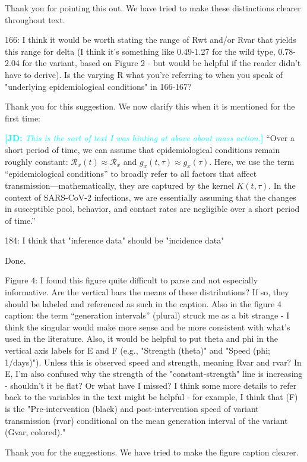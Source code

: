 \documentclass[12pt]{article}
\newcommand{\RR}{\ensuremath{{\mathcal R}}\xspace}
\newcommand{\revtext}{\textsf}
\newcommand{\comment}[3]{\textcolor{#1}{\textbf{[#2: }\textsl{#3}\textbf{]}}}
\newcommand{\jd}[1]{\comment{cyan}{JD}{#1}}
\begin{document}
Thank you for pointing this out. We have tried to make these distinctions clearer throughout text. 

\revtext{166: I think it would be worth stating the range of Rwt and/or Rvar that yields this range for delta (I think it's something like 0.49-1.27 for the wild type, 0.78-2.04 for the variant, based on Figure 2 - but would be helpful if the reader didn't have to derive). Is the varying R what you're referring to when you speak of "underlying epidemiological conditions" in 166-167?}

Thank you for this suggestion. We now clarify this when it is mentioned for the first time:

\jd{This is the sort of text I was hinting at above about mass action.}
``Over a short period of time, we can assume that epidemiological conditions remain roughly constant: $\RR_x(t) \approx \RR_x$ and $g_x(t, \tau) \approx g_x(\tau)$.
Here, we use the term ``epidemiological conditions'' to broadly refer to all factors that affect transmission---mathematically, they are captured by the kernel $K(t, \tau)$.
In the context of SARS-CoV-2 infections, we are essentially assuming that the changes in susceptible pool, behavior, and contact rates are negligible over a short period of time.''

\revtext{184: I think that "inference data" should be "incidence data"}

Done.

\revtext{Figure 4: I found this figure quite difficult to parse and not especially informative. Are the vertical bars the means of these distributions? If so, they should be labeled and referenced as such in the caption. Also in the figure 4 caption: the term ``generation intervals'' (plural) struck me as a bit strange - I think the singular would make more sense and be more consistent with what's used in the literature. Also, it would be helpful to put theta and phi in the vertical axis labels for E and F (e.g., "Strength (theta)" and "Speed (phi; 1/days)"). Unless this is observed speed and strength, meaning Rvar and rvar? In E, I'm also confused why the strength of the "constant-strength" line is increasing - shouldn't it be flat? Or what have I missed? I think some more details to refer back to the variables in the text might be helpful - for example, I think that (F) is the "Pre-intervention (black) and post-intervention speed of variant transmission (rvar) conditional on the mean generation interval of the variant (Gvar, colored)."}

Thank you for the suggestions. We have tried to make the figure caption clearer.
\end{document}
